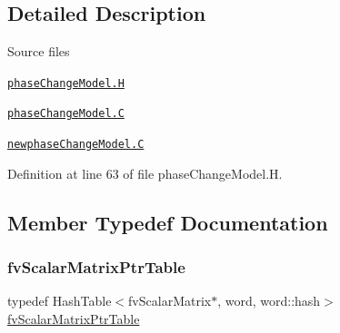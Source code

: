 \subsection{Detailed Description}
\label{_Description}%
 \begin{DoxyParagraph}{Source files}

\begin{DoxyItemize}
\item \href{../../../home/carlo/data/GeN-Foam/GeN-Foam_ffn/GeN-Foam/GeN-Foam/classes/thermalHydraulics/src/physicsModels/phaseChangeModels/phaseChangeModel.H}{\tt phase\+Change\+Model.\+H} 
\item \href{../../../home/carlo/data/GeN-Foam/GeN-Foam_ffn/GeN-Foam/GeN-Foam/classes/thermalHydraulics/src/physicsModels/phaseChangeModels/phaseChangeModel.C}{\tt phase\+Change\+Model.\+C} 
\item \href{../../../home/carlo/data/GeN-Foam/GeN-Foam_ffn/GeN-Foam/GeN-Foam/classes/thermalHydraulics/src/physicsModels/phaseChangeModels/newphaseChangeModel.C}{\tt newphase\+Change\+Model.\+C} 
\end{DoxyItemize}
\end{DoxyParagraph}


Definition at line 63 of file phase\+Change\+Model.\+H.



\subsection{Member Typedef Documentation}
\mbox{\label{classFoam_1_1phaseChangeModel_a47dacb23df9a151e6da0902f1726ef21}} 
\subsubsection{\texorpdfstring{fv\+Scalar\+Matrix\+Ptr\+Table}{fvScalarMatrixPtrTable}}
{\footnotesize\ttfamily typedef Hash\+Table$<$fv\+Scalar\+Matrix$\ast$, word, word\+::hash$>$ \hyperlink{classFoam_1_1phaseChangeModel_a47dacb23df9a151e6da0902f1726ef21}{fv\+Scalar\+Matrix\+Ptr\+Table}\hspace{0.3cm}{\ttfamily [protected]}}



